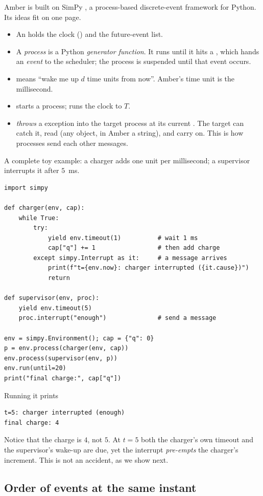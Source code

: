 Amber is built on SimPy \citep{simpy}, a process-based discrete-event framework for Python. Its ideas fit on one page.
\begin{itemize}
 \item An  holds the clock () and the future-event list.
 \item A \emph{process} is a Python \emph{generator function}. It runs until it hits a , which hands an \emph{event} to the scheduler; the process is
   suspended until that event occurs.
 \item {} means ``wake me up $d$ time units from now''. Amber's time unit is the millisecond.
 \item {} starts a process;  runs the clock to $T$.
 \item {} \emph{throws} a  exception into the target process at its current . The target can catch it, read  (any object, in Amber a string), and carry on. This is how processes send each other messages.
\end{itemize}
A complete toy example: a charger adds one unit per millisecond; a supervisor interrupts it after $5$~ms.
\begin{lstlisting}
import simpy

def charger(env, cap):
    while True:
        try:
            yield env.timeout(1)          # wait 1 ms
            cap["q"] += 1                 # then add charge
        except simpy.Interrupt as it:     # a message arrives
            print(f"t={env.now}: charger interrupted ({it.cause})")
            return

def supervisor(env, proc):
    yield env.timeout(5)
    proc.interrupt("enough")              # send a message

env = simpy.Environment(); cap = {"q": 0}
p = env.process(charger(env, cap))
env.process(supervisor(env, p))
env.run(until=20)
print("final charge:", cap["q"])
\end{lstlisting}
Running it prints
\begin{verbatim}
t=5: charger interrupted (enough)
final charge: 4
\end{verbatim}
Notice that the charge is $4$, not $5$. At $t=5$ both the charger's own timeout and the supervisor's wake-up are due, yet the interrupt \emph{pre-empts}
the charger's increment. This is not an accident, as we show next.

\subsection{Order of events at the same instant}
\label{sec:tiebreak}

